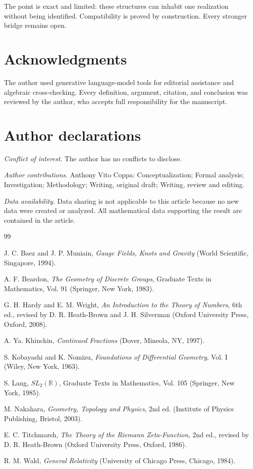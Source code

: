 \documentclass[10pt,oneside]{article}
\theoremstyle{plaincompact}
\theoremstyle{definitioncompact}
\begin{document}
The point is exact and limited: these structures can inhabit one realization
without being identified.  Compatibility is proved by construction.  Every
stronger bridge remains open.

\section*{Acknowledgments}

The author used generative language-model tools for editorial assistance and
algebraic cross-checking.  Every definition, argument, citation, and conclusion
was reviewed by the author, who accepts full responsibility for the manuscript.

\section*{Author declarations}

\noindent\textit{Conflict of interest.}
The author has no conflicts to disclose.

\medskip
\noindent\textit{Author contributions.}
Anthony Vito Coppa: Conceptualization; Formal analysis; Investigation;
Methodology; Writing, original draft; Writing, review and editing.

\medskip
\noindent\textit{Data availability.}
Data sharing is not applicable to this article because no new data were created
or analyzed.  All mathematical data supporting the result are contained in the
article.

\begin{thebibliography}{99}
\small

J. C. Baez and J. P. Muniain,
\textit{Gauge Fields, Knots and Gravity}
(World Scientific, Singapore, 1994).

A. F. Beardon,
\textit{The Geometry of Discrete Groups}, Graduate Texts in Mathematics,
Vol. 91 (Springer, New York, 1983).

G. H. Hardy and E. M. Wright,
\textit{An Introduction to the Theory of Numbers}, 6th ed., revised by
D. R. Heath-Brown and J. H. Silverman (Oxford University Press, Oxford, 2008).

A. Ya. Khinchin,
\textit{Continued Fractions} (Dover, Mineola, NY, 1997).

S. Kobayashi and K. Nomizu,
\textit{Foundations of Differential Geometry}, Vol. I
(Wiley, New York, 1963).

S. Lang,
\textit{$SL_2(\mathbb R)$}, Graduate Texts in Mathematics, Vol. 105
(Springer, New York, 1985).

M. Nakahara,
\textit{Geometry, Topology and Physics}, 2nd ed.
(Institute of Physics Publishing, Bristol, 2003).

E. C. Titchmarsh,
\textit{The Theory of the Riemann Zeta-Function}, 2nd ed., revised by
D. R. Heath-Brown (Oxford University Press, Oxford, 1986).

R. M. Wald,
\textit{General Relativity} (University of Chicago Press, Chicago, 1984).

\end{thebibliography}
\end{document}
